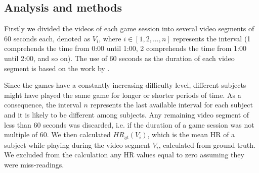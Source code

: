 

\subsection{Analysis and methods}

Firstly we divided the videos of each game session into several video segments of 60 seconds each, denoted as $V_i$, where $i \in [1, 2, ..., n]$ represents the interval (1 comprehends the time from 0:00 until 1:00, 2 comprehends the time from 1:00 until 2:00, and so on). The use of 60 seconds as the duration of each video segment is based on the work by \textcite{poh2011advancements}.

Since the games have a constantly increasing difficulty level, different subjects might have played the same game for longer or shorter periods of time. As a consequence, the interval $n$ represents the last available interval for each subject and it is likely to be different among subjects. Any remaining video segment of less than 60 seconds was discarded, i.e. if the duration of a game session was not multiple of 60. We then calculated $HR_{gt}(V_i)$, which is the mean HR of a subject while playing during the video segment $V_i$, calculated from ground truth. We excluded from the calculation any HR values equal to zero assuming they were miss-readings.

